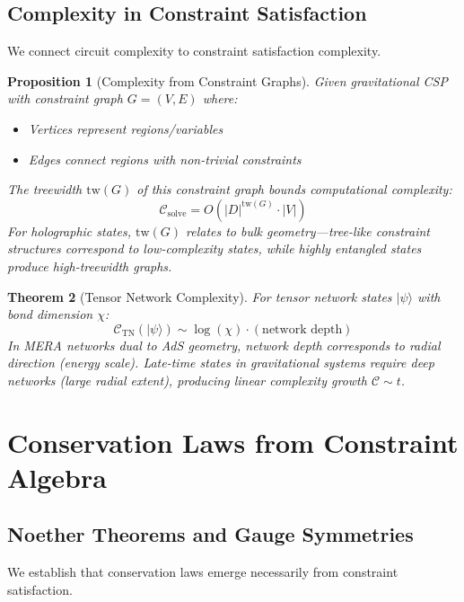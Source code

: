\documentclass[11pt,a4paper]{article}
\newtheorem{theorem}{Theorem}[section]
\newtheorem{proposition}[theorem]{Proposition}
\theoremstyle{remark}
\theoremstyle{definition}
\begin{document}
\subsection{Complexity in Constraint Satisfaction}

We connect circuit complexity to constraint satisfaction complexity.

\begin{proposition}[Complexity from Constraint Graphs]
Given gravitational CSP with constraint graph $G = (V, E)$ where:
\begin{itemize}
\item Vertices represent regions/variables
\item Edges connect regions with non-trivial constraints
\end{itemize}
The treewidth $\text{tw}(G)$ of this constraint graph bounds computational complexity:
\begin{equation}
\mathcal{C}_{\text{solve}} = O(|D|^{\text{tw}(G)} \cdot |V|)
\end{equation}
For holographic states, $\text{tw}(G)$ relates to bulk geometry—tree-like constraint structures correspond to low-complexity states, while highly entangled states produce high-treewidth graphs.
\end{proposition}

\begin{theorem}[Tensor Network Complexity]
For tensor network states $|\psi\rangle$ with bond dimension $\chi$:
\begin{equation}
\mathcal{C}_{\text{TN}}(|\psi\rangle) \sim \log(\chi) \cdot (\text{network depth})
\end{equation}
In MERA networks dual to AdS geometry, network depth corresponds to radial direction (energy scale). Late-time states in gravitational systems require deep networks (large radial extent), producing linear complexity growth $\mathcal{C} \sim t$.
\end{theorem}

\section{Conservation Laws from Constraint Algebra}
\label{sec:conservation_laws}

\subsection{Noether Theorems and Gauge Symmetries}

We establish that conservation laws emerge necessarily from constraint satisfaction.
\end{document}
